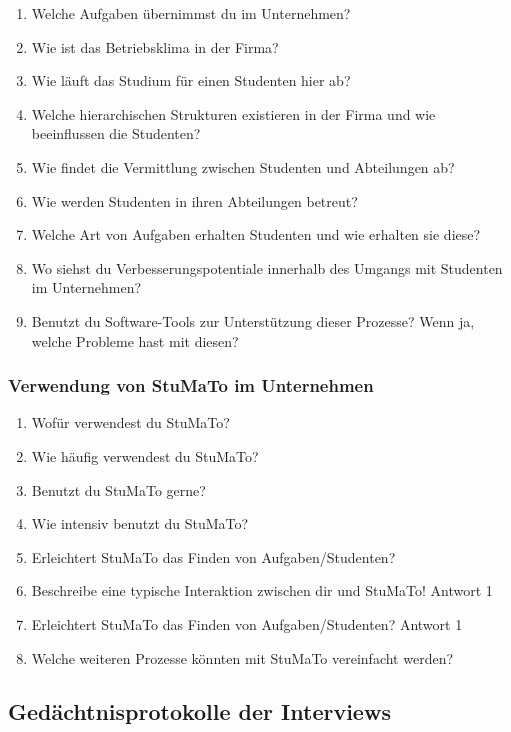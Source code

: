 \documentclass[
  12pt,
  ngerman,
  a4paper,
]{article}
\begin{document}
\begin{enumerate}
\def\labelenumi{\arabic{enumi}.}
\item
  Welche Aufgaben übernimmst du im Unternehmen?
\item
  Wie ist das Betriebsklima in der Firma?
\item
  Wie läuft das Studium für einen Studenten hier ab?
\item
  Welche hierarchischen Strukturen existieren in der Firma und wie
  beeinflussen die Studenten?
\item
  Wie findet die Vermittlung zwischen Studenten und Abteilungen ab?
\item
  Wie werden Studenten in ihren Abteilungen betreut?
\item
  Welche Art von Aufgaben erhalten Studenten und wie erhalten sie diese?
\item
  Wo siehst du Verbesserungspotentiale innerhalb des Umgangs mit
  Studenten im Unternehmen?
\item
  Benutzt du Software-Tools zur Unterstützung dieser Prozesse? Wenn ja,
  welche Probleme hast mit diesen?
\end{enumerate}

\hypertarget{verwendung-von-stumato-im-unternehmen}{%
\subsubsection{Verwendung von StuMaTo im
Unternehmen}\label{verwendung-von-stumato-im-unternehmen}}

\begin{enumerate}
\def\labelenumi{\arabic{enumi}.}
\setcounter{enumi}{9}
\item
  Wofür verwendest du StuMaTo?
\item
  Wie häufig verwendest du StuMaTo?
\item
  Benutzt du StuMaTo gerne?
\item
  Wie intensiv benutzt du StuMaTo?
\item
  Erleichtert StuMaTo das Finden von Aufgaben/Studenten?
\item
  Beschreibe eine typische Interaktion zwischen dir und StuMaTo! Antwort
  1
\item
  Erleichtert StuMaTo das Finden von Aufgaben/Studenten? Antwort 1
\item
  Welche weiteren Prozesse könnten mit StuMaTo vereinfacht werden?
\end{enumerate}

\hypertarget{geduxe4chtnisprotokolle-der-interviews}{%
\subsection{Gedächtnisprotokolle der
Interviews}\label{geduxe4chtnisprotokolle-der-interviews}}
\end{document}
